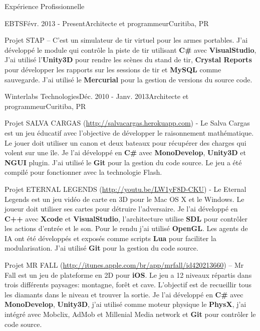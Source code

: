 \documentclass{resume}
\begin{document}
  \begin{rSection}{Expérience Profissionnelle}
    \begin{rSubsection}{EBTS}{Févr. 2013 - Present}{Architecte et programmeur}{Curitiba, PR}
    \item Projet STAP – C'est un simulateur de tir virtuel pour les armes portables. J'ai développé le module qui contrôle la piste de tir utilisant \textbf{C\#} avec \textbf{VisualStudio}, J'ai utilisé l'\textbf{Unity3D} pour rendre les scènes du stand de tir, \textbf{Crystal Reports} pour développer les rapports sur les sessions de tir et \textbf{MySQL} comme sauvegarde.  J'ai utilisé le \textbf{Mercurial} pour la gestion de versions du source code.
    \end{rSubsection}
    \begin{rSubsection}{Winterlabs Technologies}{Déc. 2010 - Janv. 2013}{Architecte et programmeur}{Curitiba, PR}
    \item Projet SALVA CARGAS (\url{http://salvacargas.herokuapp.com}) - Le Salva Cargas est un jeu éducatif avec l'objective de développer le raisonnement mathématique. Le jouer doit utiliser un canon et deux bateaux pour récupérer des charges qui volent sur une île. Je l'ai développé en \textbf{C\#} avec \textbf{MonoDevelop}, \textbf{Unity3D} et \textbf{NGUI} plugin. J'ai utilisé le \textbf{Git} pour la gestion du code source. Le jeu a été compilé pour fonctionner avec la technologie Flash. \\
    \item Projet ETERNAL LEGENDS (\url{http://youtu.be/LW1yF8D-CKU}) - Le Eternal Legends est un jeu vidéo de carte en 3D pour le Mac OS X et le Windows. Le joueur doit utiliser ses cartes pour détruire l'adversaire. Je l’ai développé en \textbf{C++} avec \textbf{Xcode} et \textbf{VisualStudio}, l’architecture utilise \textbf{SDL} pour contrôler les actions d’entrée et le son. Pour le rendu j’ai utilisé \textbf{OpenGL}. Les agents de IA ont été développés et exposés comme scripts \textbf{Lua} pour faciliter la modularisation. J’ai utilisé \textbf{Git} pour la gestion du code source. \\
    \item Projet MR FALL (\url{http://itunes.apple.com/br/app/mrfall/id420213660}) – Mr Fall est un jeu de plateforme en 2D pour \textbf{iOS}. Le jeu a 12 niveaux répartis dans trois différents paysages: montagne, forêt et cave. L'objectif est de recueillir tous les diamants dans le niveau et trouver la sortie. Je l’ai développé en \textbf{C\#} avec \textbf{MonoDevelop}, \textbf{Unity3D}, j'ai utilisé comme moteur physique le \textbf{PhysX}, j'ai intégré avec Mobclix, AdMob et Millenial Media network et \textbf{Git} pour  contrôler le code source. \\

\end{rSubsection}
\end{rSection}
\end{document}
